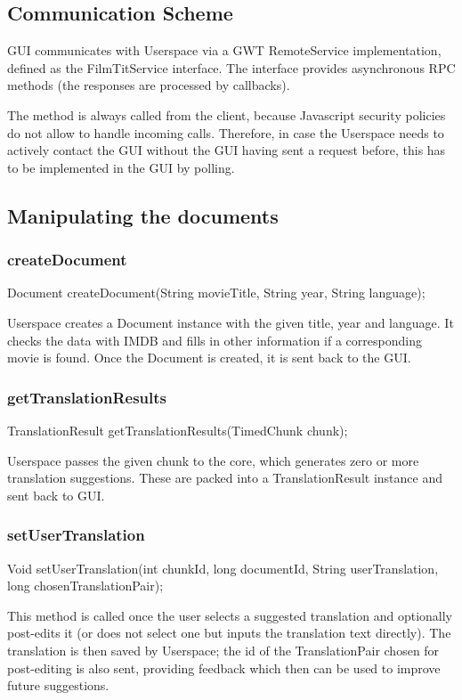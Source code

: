 \subsection{Communication Scheme}
GUI communicates with Userspace via a GWT RemoteService implementation, defined as the FilmTitService interface.
The interface provides asynchronous RPC methods (the responses are processed by callbacks).

The method is always called from the client, because Javascript security policies do not allow to handle incoming calls.
Therefore, in case the Userspace needs to actively contact the GUI without the GUI having sent a request before,
this has to be implemented in the GUI by polling.

\subsection{Manipulating the documents}

\subsubsection{createDocument}
	Document createDocument(String movieTitle, String year, String language);

Userspace creates a Document instance with the given title, year and language.
It checks the data with IMDB and fills in other information if a corresponding movie is found.
Once the Document is created, it is sent back to the GUI.

\subsubsection{getTranslationResults}
	TranslationResult getTranslationResults(TimedChunk chunk);
	
Userspace passes the given chunk to the core, which generates zero or more translation suggestions.
These are packed into a TranslationResult instance and sent back to GUI.
	
\subsubsection{setUserTranslation}
	Void setUserTranslation(int chunkId, long documentId, String userTranslation, long chosenTranslationPair);

This method is called once the user selects a suggested translation and optionally post-edits it
(or does not select one but inputs the translation text directly).
The translation is then saved by Userspace;
the id of the TranslationPair chosen for post-editing is also sent, providing feedback which then can be used to improve future suggestions.

